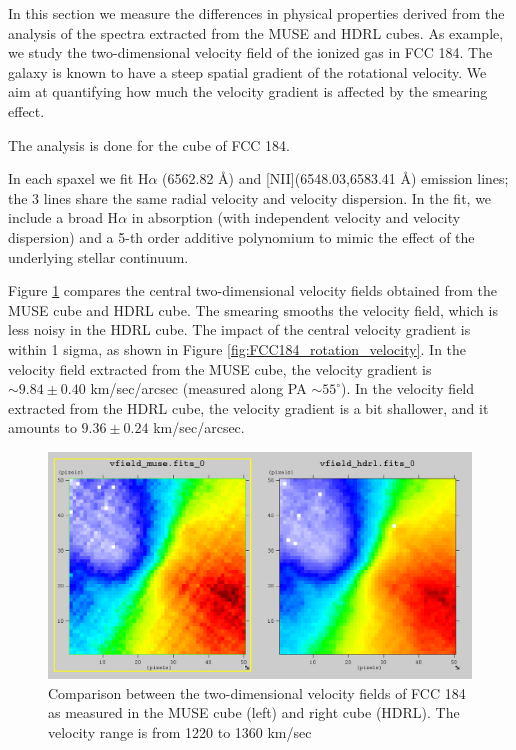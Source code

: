 In this section we measure the differences in physical properties
derived from the analysis of the spectra extracted from the MUSE and
HDRL cubes. As example, we study the two-dimensional velocity field of
the ionized gas in FCC 184. The galaxy is known to have a steep
spatial gradient of the rotational velocity. We aim at quantifying how
much the velocity gradient is affected by the smearing effect.

The analysis is done for the cube of FCC 184.

In each spaxel we fit H$\alpha$ (6562.82 \AA) and
[N\small{II}](6548.03,6583.41 \AA) emission lines; the 3 lines share
the same radial velocity and velocity dispersion. In the fit, we
include a broad H$\alpha$ in absorption (with independent velocity and
velocity dispersion) and a 5-th order additive polynomium to mimic the
effect of the underlying stellar continuum.

Figure \ref{fig:FCC184_velocity_field} compares the central
two-dimensional velocity fields obtained from the MUSE cube and HDRL
cube. The smearing smooths the velocity field, which is less noisy in
the HDRL cube. The impact of the central velocity gradient is within 1
sigma, as shown in Figure \ref{fig:FCC184_rotation_velocity}. In the
velocity field extracted from the MUSE cube, the velocity gradient is
$\sim 9.84 \pm 0.40$ km/sec/arcsec (measured along PA
$ \sim 55^{\circ}$). In the velocity field extracted from the HDRL
cube, the velocity gradient is a bit shallower, and it amounts to
$9.36 \pm 0.24$ km/sec/arcsec.




\begin{figure}[H]
\centering
\includegraphics[width=16cm]{figures/FCC184_velocity_field.jpeg}
\caption[] {\footnotesize Comparison between the two-dimensional velocity fields of
  FCC 184 as measured in the MUSE cube (left) and right cube
  (HDRL). The velocity range is from 1220 to 1360 km/sec}
\label{fig:FCC184_velocity_field}
\end{figure}

